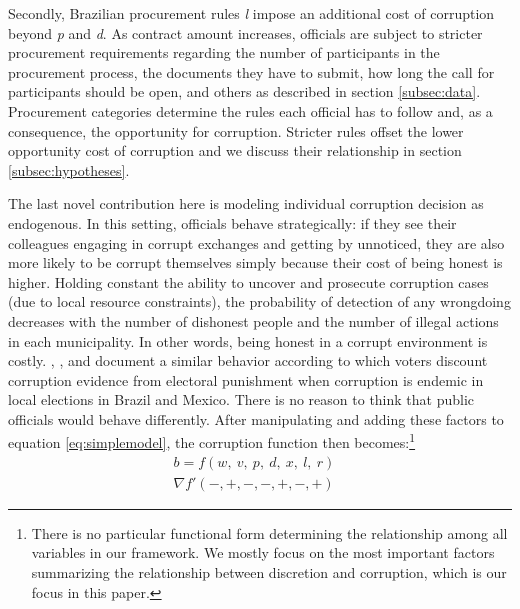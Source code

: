 \documentclass[11pt]{article}
\begin{document}
Secondly, Brazilian procurement rules \emph{l} impose an additional cost of corruption beyond \emph{p} and \emph{d}. As contract amount increases, officials are subject to stricter procurement requirements regarding the number of participants in the procurement process, the documents they have to submit, how long the call for participants should be open, and others as described in section \ref{subsec:data}. Procurement categories determine the rules each official has to follow and, as a consequence, the opportunity for corruption. Stricter rules offset the lower opportunity cost of corruption and we discuss their relationship in section \ref{subsec:hypotheses}.

The last novel contribution here is modeling individual corruption decision as endogenous. In this setting, officials behave strategically: if they see their colleagues engaging in corrupt exchanges and getting by unnoticed, they are also more likely to be corrupt themselves simply because their cost of being honest is higher. Holding constant the ability to uncover and prosecute corruption cases (due to local resource constraints), the probability of detection of any wrongdoing decreases with the number of dishonest people and the number of illegal actions in each municipality. In other words, being honest in a corrupt environment is costly. \citet{FerrazExposingCorruptPoliticians2008b}, \citet{WintersLackingInformationCondoning2013}, and \citet{ChongDoesCorruptionInformation2015} document a similar behavior according to which voters discount corruption evidence from electoral punishment when corruption is endemic in local elections in Brazil and Mexico. There is no reason to think that public officials would behave differently. After manipulating and adding these factors to equation \ref{eq:simplemodel}, the corruption function then becomes:\footnote{There is no particular functional form determining the relationship among all variables in our framework. We mostly focus on the most important factors summarizing the relationship between discretion and corruption, which is our focus in this paper.}
\begin{equation} \label{eq:bribefunction}
  \begin{aligned}
    b = f(w,\ v,\ p,\ d,\ x,\ l,\ r)& \\
    \nabla f'(-,+,-,-,+,-,+)&
  \end{aligned}
\end{equation}
\end{document}
